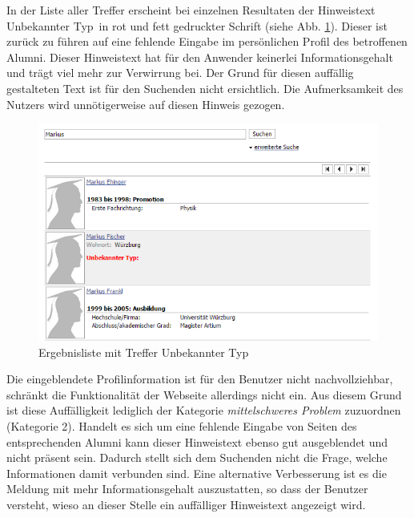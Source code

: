 {
	In der Liste aller Treffer erscheint bei einzelnen Resultaten der Hinweistext \glqq Unbekannter Typ\grqq ~in rot und fett gedruckter Schrift (siehe Abb. \ref{fig:suche:unbekanntertyp}). Dieser ist zurück zu führen auf eine  fehlende Eingabe im persönlichen Profil des betroffenen Alumni. Dieser Hinweistext hat für den Anwender keinerlei Informationsgehalt und trägt viel mehr zur Verwirrung bei. Der Grund für diesen auffällig gestalteten Text ist für den Suchenden nicht ersichtlich. Die Aufmerksamkeit des Nutzers wird unnötigerweise auf diesen Hinweis gezogen.
	\begin{figure}[h]
		\centering
		\includegraphics[scale=0.75]{figures/unbekannter_typ.png}
		\caption{Ergebnisliste mit Treffer \glqq Unbekannter Typ\grqq}
		\label{fig:suche:unbekanntertyp}
	\end{figure}
}
{
	 Die eingeblendete Profilinformation ist für den Benutzer nicht nachvollziehbar, schränkt die Funktionalität der Webseite allerdings nicht ein. Aus diesem Grund ist diese Auffälligkeit lediglich der Kategorie \emph{mittelschweres Problem} zuzuordnen (Kategorie 2).
}
{
	Handelt es sich um eine fehlende Eingabe von Seiten des entsprechenden Alumni kann dieser Hinweistext ebenso gut ausgeblendet und nicht präsent sein. Dadurch stellt sich dem Suchenden nicht die Frage, welche Informationen damit verbunden sind. Eine alternative Verbesserung ist es die Meldung mit mehr Informationsgehalt auszustatten, so dass der Benutzer versteht, wieso an dieser Stelle ein auffälliger Hinweistext angezeigt wird.
}
\label{prob:suche:unbekanntertyp}

